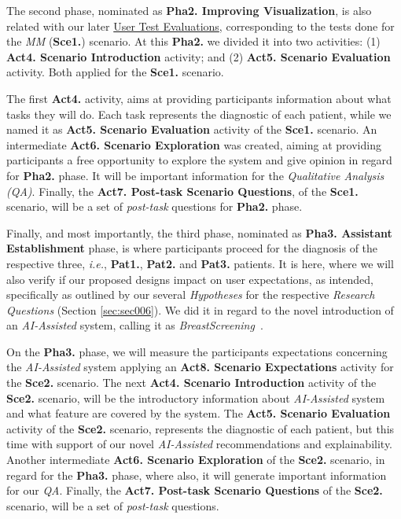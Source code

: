 The second phase, nominated as \textbf{Pha2. Improving Visualization}, is also related with our later \href{https://github.com/MIMBCD-UI/prototype-breast-screening/wiki/User-Research#user-test-evaluations-}{User Test Evaluations}, corresponding to the tests done for the {\it \gls{MM}} (\textbf{Sce1.}) scenario. At this \textbf{Pha2.} we divided it into two activities: (1) \textbf{Act4. Scenario Introduction} activity; and (2) \textbf{Act5. Scenario Evaluation} activity. Both applied for the {\bf Sce1.} scenario.

The first \textbf{Act4.} activity, aims at providing participants information about what tasks they will do. Each task represents the diagnostic of each patient, while we named it as \textbf{Act5. Scenario Evaluation} activity of the {\bf Sce1.} scenario. An intermediate \textbf{Act6. Scenario Exploration} was created, aiming at providing participants a free opportunity to explore the system and give opinion in regard for {\bf Pha2.} phase. It will be important information for the {\it Qualitative Analysis (QA)}. Finally, the \textbf{Act7. Post-task Scenario Questions}, of the {\bf Sce1.} scenario, will be a set of \textit{post-task} questions for {\bf Pha2.} phase.

Finally, and most importantly, the third phase, nominated as \textbf{Pha3. Assistant Establishment} phase, is where participants proceed for the diagnosis of the respective three, \textit{i.e.}, \textbf{Pat1.}, \textbf{Pat2.} and \textbf{Pat3.} patients. It is here, where we will also verify if our proposed designs impact \cite{amershi2019guidelines, kocielnik2019will} on user expectations, as intended, specifically as outlined by our several \textit{Hypotheses} for the respective \textit{Research Questions} (Section \ref{sec:sec006}). We did it in regard to the novel introduction of an \textit{AI-Assisted} system, calling it as \textit{BreastScreening}~\cite{calistobreastscreening, santiago2018combining}.

On the {\bf Pha3.} phase, we will measure the participants expectations concerning the \textit{AI-Assisted} system applying an \textbf{Act8. Scenario Expectations} activity for the {\bf Sce2.} scenario. The next \textbf{Act4.  Scenario Introduction} activity of the {\bf Sce2.} scenario, will be the introductory information about \textit{AI-Assisted} system and what feature are covered by the system. The \textbf{Act5. Scenario Evaluation} activity of the {\bf Sce2.} scenario, represents the diagnostic of each patient, but this time with support of our novel \textit{AI-Assisted} recommendations and explainability. Another intermediate \textbf{Act6. Scenario Exploration} of the {\bf Sce2.} scenario, in regard for the {\bf Pha3.} phase, where also, it will generate important information for our {\it QA}. Finally, the \textbf{Act7. Post-task Scenario Questions} of the {\bf Sce2.} scenario, will be a set of \textit{post-task} questions.

